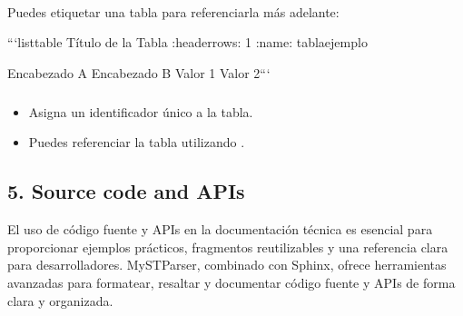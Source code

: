 \documentclass[a4paper,10pt,spanish]{sphinxmanual}
\begin{document}
\paragraph{}
\label{\detokenize{configuracion_inicial/013.guia_de_myst_parser:agregar-una-etiqueta-a-una-tabla}}
\sphinxAtStartPar
Puedes etiquetar una tabla para referenciarla más adelante:

\begin{sphinxVerbatim}[commandchars=\\\{\}]
```\PYGZob{}list\PYGZhy{}table\PYGZcb{} Título de la Tabla
:header\PYGZhy{}rows: 1
:name: tabla\PYGZhy{}ejemplo

\PYGZhy{} Encabezado A
Encabezado B
\PYGZhy{} Valor 1
Valor 2```
\end{sphinxVerbatim}


\subparagraph{}
\label{\detokenize{configuracion_inicial/013.guia_de_myst_parser:id4}}\begin{itemize}
\item {} 
\sphinxAtStartPar
{} Asigna un identificador único a la tabla.

\item {} 
\sphinxAtStartPar
Puedes referenciar la tabla utilizando .

\end{itemize}


\subsection{5. Source code and APIs}
\label{\detokenize{configuracion_inicial/013.guia_de_myst_parser:source-code-and-apis}}
\sphinxAtStartPar
El uso de código fuente y APIs en la documentación técnica es esencial para proporcionar ejemplos prácticos, fragmentos reutilizables y una referencia clara para desarrolladores. MyST\sphinxhyphen{}Parser, combinado con Sphinx, ofrece herramientas avanzadas para formatear, resaltar y documentar código fuente y APIs de forma clara y organizada.


\subsubsection{}
\label{\detokenize{configuracion_inicial/013.guia_de_myst_parser:mostrar-codigo-fuente-en-markdown}}
\end{document}
